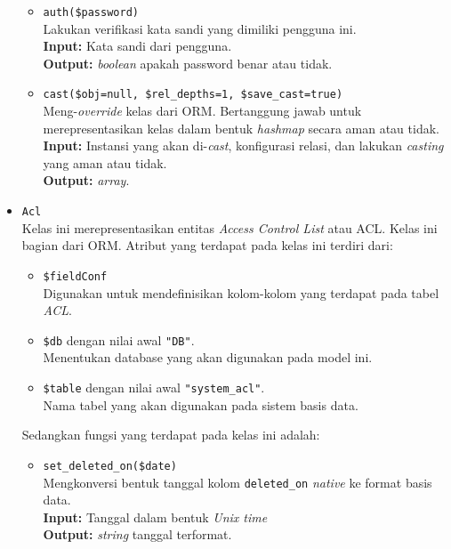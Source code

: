 \begin{itemize}
\begin{itemize}
                \item \texttt{auth(\$password)} \\
                    Lakukan verifikasi kata sandi yang dimiliki pengguna ini. \\
                    \textbf{Input:} Kata sandi dari pengguna.\\
                    \textbf{Output:} \textit{boolean} apakah password benar atau tidak.
                
                \item \texttt{cast(\$obj=null, \$rel\_depths=1, \$save\_cast=true)} \\
                    Meng-\textit{override} kelas dari ORM. Bertanggung jawab untuk merepresentasikan
                    kelas dalam bentuk \textit{hashmap} secara aman atau tidak. \\
                    \textbf{Input:} Instansi yang akan di-\textit{cast}, konfigurasi relasi, dan
                        lakukan \textit{casting} yang aman atau tidak.\\
                    \textbf{Output:} \textit{array}.

            \end{itemize}
            
        \item \texttt{Acl} \\
            Kelas ini merepresentasikan entitas \textit{Access Control List} atau ACL. Kelas ini bagian
            dari ORM. Atribut yang terdapat pada kelas ini terdiri dari:
            \begin{itemize}
                \item \texttt{\$fieldConf} \\
                    Digunakan untuk mendefinisikan kolom-kolom yang terdapat pada tabel \textit{ACL}.
                \item \texttt{\$db} dengan nilai awal \texttt{"DB"}. \\
                    Menentukan database yang akan digunakan pada model ini.
                \item \texttt{\$table} dengan nilai awal \texttt{"system\_acl"}. \\
                    Nama tabel yang akan digunakan pada sistem basis data. 
            \end{itemize}
            Sedangkan fungsi yang terdapat pada kelas ini adalah:
            \begin{itemize}
                \item \texttt{set\_deleted\_on(\$date)}\\
                    Mengkonversi bentuk tanggal kolom \texttt{deleted\_on} \textit{native} ke 
                    format basis data. \\
                    \textbf{Input:} Tanggal dalam bentuk \textit{Unix time}\\
                    \textbf{Output:} \textit{string} tanggal terformat.
                

\end{itemize}
\end{itemize}
